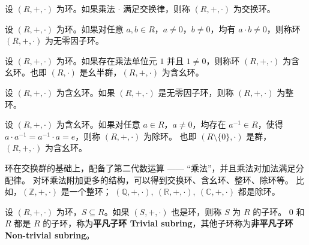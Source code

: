 \begin{definition}
    设 $ (R,+,\cdot) $ 为环。如果乘法 $\cdot$ 满足交换律，则称 $ (R,+,\cdot) $ 为交换环。
    \label{def:commutative_ring}
\end{definition}

\begin{definition}
    设 $ (R,+,\cdot) $ 为环。如果对任意 $ a,b\in R $，$ a\neq 0 $，$ b\neq 0 $，均有 $ a\cdot b \neq 0 $，则称环 $ (R,+,\cdot) $ 为无零因子环。
    \label{def:ring_without_zero_divisors}
\end{definition}

\begin{definition}
    设 $ (R,+,\cdot) $ 为环。如果存在乘法单位元 $1$ 并且 $1\neq 0$，则称环 $ (R,+,\cdot) $ 为含幺环。也即 $(R,\cdot)$ 是幺半群，$ (R,+,\cdot) $ 为含幺环。
    \label{def:ring_with_identity}
\end{definition}

\begin{definition}
    设 $ (R,+,\cdot) $ 为含幺环。如果 $ (R,+,\cdot) $ 是无零因子环，则称 $ (R,+,\cdot) $ 为整环。
    \label{def:integral_domain}
\end{definition}

\begin{definition}
    设 $ (R,+,\cdot) $ 为含幺环。如果对任意 $ a\in R $，$ a\neq 0 $，均存在 $ a^{-1}\in R $，使得 $ a\cdot a^{-1} = a^{-1}\cdot a = e $，则称 $ (R,+,\cdot) $ 为除环。
    也即  $(R\setminus\{0\},\cdot)$ 是群，$ (R,+,\cdot) $ 为含幺环。
    \label{def:division_ring}
\end{definition}

\begin{note}
    环在交换群的基础上，配备了第二代数运算 —— “乘法”，并且乘法对加法满足分配律。
    对环乘法附加更多的结构，可以得到交换环、含幺环、整环、除环等。
    比如，$(\mathbb{Z},+,\cdot)$ 是一个整环；
    $(\mathbb{Q},+,\cdot),\ (\mathbb{R},+,\cdot),\ (\mathbb{C},+,\cdot)$ 都是除环。
\end{note}
\vspace{1em}

\begin{definition}[子环 Subring]
    设 $ (R,+,\cdot) $ 为环，$ S\subseteq R $。如果 $ (S,+,\cdot) $ 也是环，则称 $ S $ 为 $ R $ 的子环。
    ${0}$ 和 $ R $ 都是 $ R $ 的子环，称为\textbf{平凡子环 Trivial subring}，其他子环称为\textbf{非平凡子环 Non-trivial subring}。
    \label{def:subring}
\end{definition}

